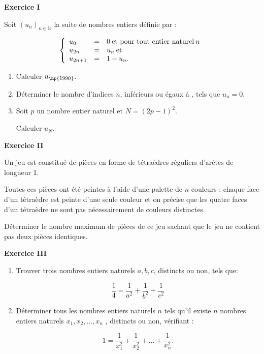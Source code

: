 \documentclass[a4paper,11pt]{article}
\newcommand{\N}{\mathbb{N}}
\begin{document}
\begin{center}\textbf{{\color{blue} Exercice I}}
\end{center}

Soit $\left(u_n\right)_{n \in \N}$ la suite de nombres entiers définie par : 

\[\left\{\begin{array}{l c l}
u_0			&=&0 \: \text{et pour tout entier naturel}\: n\\
u_{2n}		&=& u_n \: \text{et}\\
u_{2n+ 1} 	&=& 1 - u_n.
\end{array}\right.\]

\medskip

\begin{enumerate}
\item Calculer $u_{\np{1990}}$.
\item Déterminer le nombre d'indices $n$, inférieurs ou égaux à , tels que $u_n = 0$.
\item Soit $p$ un nombre entier naturel et $N = (2p - 1)^2$. 

Calculer $u_N$.
\end{enumerate}

\begin{center}\textbf{{\color{blue} Exercice II}}
\end{center}

Un jeu est constitué de pièces en forme de tétraèdres réguliers d'arêtes de longueur 1.

Toutes ces pièces ont été peintes à l'aide d'une palette de $n$ couleurs : chaque face d'un tétraèdre est peinte d'une seule couleur et on précise que les quatre faces d'un tétraèdre ne sont pas nécessairement de couleurs distinctes. 

Déterminer le nombre maximum de pièces de ce jeu sachant que le jeu ne contient pas deux pièces identiques.

\begin{center}\textbf{{\color{blue} Exercice III}}
\end{center}

\begin{enumerate}
\item Trouver trois nombres entiers naturels $a, b, c$, distincts ou non, tels que:

\[\dfrac14 = \dfrac1{a^2}  + \dfrac1{b^2} + \dfrac1{c^2}\]

\item Déterminer tous les nombres entiers naturels $n$ tels qu'il existe $n$ nombres entiers naturels $x_1, x_2, ... , x_n$ , distincts ou non, vérifiant :


\[1 = \dfrac1{x_1^2}  + \dfrac1{x_2^2} + \ldots+ \dfrac1{x_n^2}.\]

\end{enumerate}
\end{document}
